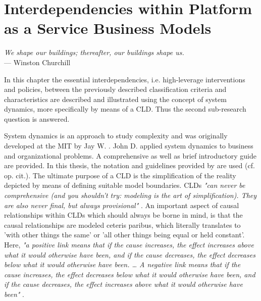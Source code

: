 \chapter[Interdependencies within Platform as a Service Business Models]{Interdependencies within Platform as a Service Business Models}\label{ch:cld}

\begin{flushright}{\slshape    
	We shape our buildings; thereafter, our buildings shape us.} \\ \medskip
	--- Winston Churchill
\end{flushright}

\noindent In this chapter the essential interdependencies, i.e. high-leverage interventions and policies, between the previously described classification criteria and characteristics are described and illustrated using the concept of system dynamics, more specifically by means of a \acf{CLD}. Thus the second sub-research question is answered. 

System dynamics is an approach to study complexity and was originally developed at the \ac{MIT} by Jay W. \citet{Forrester1961}. John D. \citeauthor{Sterman2000} applied system dynamics to business and organizational problems. A comprehensive \citep{Sterman2000} as well as brief \citep{Sterman2001} introductory guide are provided. In this thesis, the notation and guidelines provided by \citeauthor{Sterman2000} are used (cf. op. cit.). The ultimate purpose of a \ac{CLD} is the simplification of the reality depicted by means of defining suitable model boundaries. \acp{CLD} \textit{"can never be comprehensive (and you shouldn't try: modeling is the art of simplification). They are also never final, but always provisional"} \citep[p. 166]{Sterman2000}. An important aspect of causal relationships within \acp{CLD} which should always be borne in mind, is that the causal relationships are modeled ceteris paribus, which literally translates to 'with other things the same' or 'all other things being equal or held constant'. Here, \textit{"a positive link means that if the cause increases, the effect increases above what it would otherwise have been, and if the cause decreases, the effect decreases below what it would otherwise have been. \ldots\xspace A negative link means that if the cause increases, the effect decreases below what it would otherwise have been, and if the cause decreases, the effect increases above what it would otherwise have been"} \citep[p. 139]{Sterman2000}.

